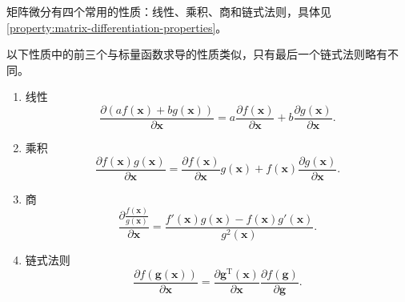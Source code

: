 矩阵微分有四个常用的性质：线性、乘积、商和链式法则，具体见\cref{property:matrix-differentiation-properties}。

\begin{property}[矩阵微分的四个性质] \label{property:matrix-differentiation-properties}
    以下性质中的前三个与标量函数求导的性质类似，只有最后一个链式法则略有不同。
    \begin{enumerate}
        \item 线性
              \begin{equation}
                  \frac{\partial(af(\bm{x})+bg(\bm{x}))}{\partial \bm{x}}=a\frac{\partial f(\bm{x})}{\partial \bm{x}}+b\frac{\partial g(\bm{x})}{\partial \bm{x}}.
              \end{equation}
        \item 乘积
              \begin{equation}
                  \frac{\partial f(\bm{x})g(\bm{x})}{\partial \bm{x}}=\frac{\partial f(\bm{x})}{\partial \bm{x}}g(\bm{x})+f(\bm{x})\frac{\partial g(\bm{x})}{\partial \bm{x}}.
              \end{equation}
        \item 商
              \begin{equation}
                  \frac{\partial \frac{f(\bm{x})}{g(\bm{x})}}{\partial \bm{x}}=\frac{f'(\bm{x})g(\bm{x})-f(\bm{x})g'(\bm{x})}{g^2(\bm{x})}.
              \end{equation}
        \item 链式法则
              \begin{equation}
                  \frac{\partial f(\mathbf{g}(\bm{x}))}{\partial \bm{x}}=\frac{\partial \mathbf{g}^{\mathrm{T}}(\bm{x})}{\partial \bm{x}}\frac{\partial f(\mathbf{g})}{\partial \mathbf{g}}.
              \end{equation}
    \end{enumerate}
\end{property}

